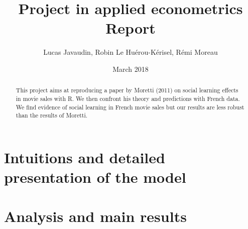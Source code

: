 \documentclass{article}
\title{Project in applied econometrics\\ Report}
\author{Lucas Javaudin, Robin Le Huérou-Kérisel, Rémi Moreau}
\date{March 2018}
\begin{document}
\maketitle

%
%
%
%
%
\begin{abstract}
	This project aims at reproducing a paper by Moretti (2011) on social learning effects in movie sales with R. We then confront his theory and predictions with French data. We find evidence of social learning in French movie sales but our results are less robust than the results of Moretti.
\end{abstract}
\tableofcontents
\pagebreak
\section{Intuitions and detailed presentation of the model}


\pagebreak
\section{Analysis and main results}




\end{document}
